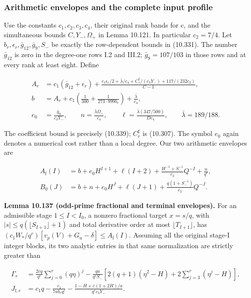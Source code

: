 \documentclass[
  11pt,
  a4paper,
]{article}
\begin{document}
\subsubsection{Arithmetic envelopes and the complete input
profile}\label{arithmetic-envelopes-and-the-complete-input-profile}

Use the constants \(c_1,c_2,c_3,c_4\), their original rank bands for c,
and the simultaneous bounds \(C,Y_-,\Omega_+\) in Lemma 10.121. In
particular \(c_2=7/4\). Let \(b_r,\epsilon_r,\bar g_{12},\bar g_9,S_-\)
be exactly the row-dependent bounds in (10.331). The number
\(\bar g_{12}\) is zero in the degree-one rows I.2 and III.2;
\(\bar g_9=107/103\) in those rows and at every rank at least eight.
Define

\[
\begin{aligned}
A_r&=c_1(\bar g_{12}+\epsilon_r)+
\frac{c_1\epsilon_r/2+\bar\lambda/c_4+
C_r^{\sharp}/(c_3Y_-)+117/(232c_2)}{C-1},\\
b&=A_r+c_1\left(\frac1{300}+\frac1{273\cdot999b_r}\right)
+\frac{\bar\lambda}{c_4},\\
e_0&=\frac{\bar g_9}{c_3Y_-},\qquad
n=\frac{\bar\lambda\Omega_+}{c_4},\qquad
\ell=\frac{\bar\lambda(347/500)}{Dc_4},\qquad
\bar\lambda=189/188.
\end{aligned}
\tag{10.379}
\]

The coefficient bound is precisely (10.339); \(C_r^{\sharp}\) is
(10.307). The symbol \(e_0\) again denotes a numerical cost rather than
a local degree. Our two arithmetic envelopes are

\[
\begin{aligned}
A_{\mathrm f}(I)&=b+e_0H^{I+1}+\ell(I+2)
+\frac{H^{-1}+S_-^{-1}}{c_2}Q^{-I}+\frac n{q^r},\\
B_0(J)&=b+n+e_0H^J+\ell(J+1)
+\frac{q(1+S_-^{-1})}{c_2}Q^{-J}.
\end{aligned}
\tag{10.380}
\]

\textbf{Lemma 10.137 (odd-prime fractional and terminal envelopes).} For
an admissible stage \(1\le I<I_0\), a nonzero fractional target
\(x=s/q\), with \(|s|\le q(\lfloor S_{I+1}\rfloor+1)\) and total
derivative order at most \(\lfloor T_{I+1}\rfloor\), has
\((c_1W_*/q^r)[v_p(V)+G_u-\delta]\le A_{\mathrm f}(I)\). Assuming all
the original stage-I integer blocks, its two analytic entries in that
same normalization are strictly greater than

\[
\begin{aligned}
\Gamma_r&=\frac{2cq}{q^r}\sum_{j=0}^r(q\eta)^j
-\frac{qa}{q^rS_-}
\left[2(q+1)(\eta^2-H)+2\sum_{j=3}^r(\eta^j-H)\right],\\
J_{\mathrm f,r}&=c_1q-\frac{c_1}{7ab_rq^r}
-\frac{1-H+c(1+2H)/a}{q^rc_3Y_-}.
\end{aligned}
\tag{10.381}
\]
\end{document}
